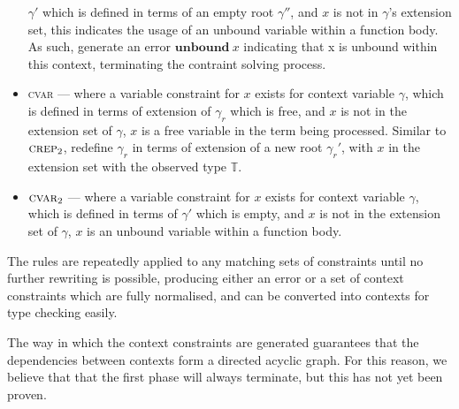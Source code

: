 \documentclass{article}
\begin{document}
\begin{itemize}
$\gamma'$ which is defined in terms of an empty root $\gamma''$,
and $x$ is not in $\gamma$'s extension set, this indicates the usage
of an unbound variable within a function body. As such, generate an
error $\mathbf{unbound}\:x$ indicating that x is unbound within this
context, terminating the contraint solving process.
\item \textsc{cvar} --- where a variable constraint for $x$ exists
for context variable $\gamma$, which is defined in terms of
extension of $\gamma_r$ which is free, and $x$ is not in the extension
set of $\gamma$, $x$ is a free variable in the term being processed. 
Similar to $\textsc{crep}_2$, redefine $\gamma_r$
in terms of extension of a new root $\gamma_r'$, with $x$ in
the extension set with the observed type $\mathbb{T}$.
\item $\textsc{cvar}_2$ --- where a variable constraint for $x$ exists
for context variable $\gamma$, which is defined in terms of $\gamma'$
which is empty, and $x$ is not in the extension set of $\gamma$, 
$x$ is an unbound variable within a function body.
\end{itemize}

The rules are repeatedly applied to any matching sets of constraints
until no further rewriting is possible, producing either an error
or a set of context constraints which are fully normalised, and
can be converted into contexts for type checking easily.

The way in which the context constraints are generated guarantees
that the dependencies between contexts form a directed acyclic graph. For
this reason, we believe that that the first phase will always terminate,
but this has not yet been proven.
\end{document}
